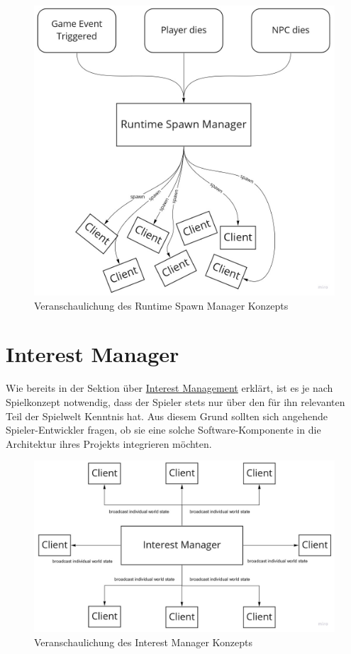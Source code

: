 \begin{figure}
	\centering
	\includegraphics[width=150mm]{images/Runtime_Spawn_Manager.jpg}
	\caption[Runtime Spawn Manager]{Veranschaulichung des Runtime Spawn Manager Konzepts}
	\label{pic:Runtime_Spawn_Manager}
\end{figure}

\section{Interest Manager}

Wie bereits in der Sektion über \hyperref[interest_management]{Interest Management} erklärt, ist es je nach Spielkonzept notwendig, dass der Spieler stets nur über den für ihn relevanten Teil der Spielwelt Kenntnis hat. Aus diesem Grund sollten sich angehende Spieler-Entwickler fragen, ob sie eine solche Software-Komponente in die Architektur ihres Projekts integrieren möchten.

\begin{figure}
	\centering
	\includegraphics[width=150mm]{images/Interest_Manager.jpg}
	\caption[Interest Manager]{Veranschaulichung des Interest Manager Konzepts}
	\label{pic:Interest_Manager}
\end{figure}

